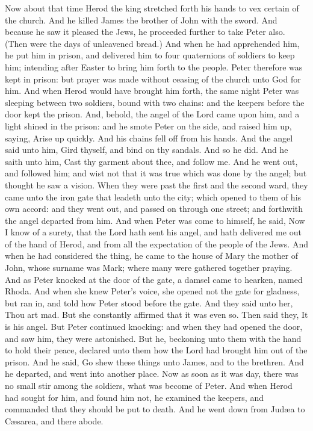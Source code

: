  Now about that time Herod the king stretched forth his
hands to vex certain of the church.  And he killed James
the brother of John with the sword.  And because he saw it
pleased the Jews, he proceeded further to take Peter also. (Then were
the days of unleavened bread.)  And when he had
apprehended him, he put him in prison, and delivered him to four
quaternions of soldiers to keep him; intending after Easter to bring him
forth to the people.  Peter therefore was kept in prison:
but prayer was made without ceasing of the church unto God for him.
 And when Herod would have brought him forth, the same
night Peter was sleeping between two soldiers, bound with two chains:
and the keepers before the door kept the prison.  And,
behold, the angel of the Lord came upon him, and a light shined in the
prison: and he smote Peter on the side, and raised him up, saying, Arise
up quickly. And his chains fell off from his hands.  And
the angel said unto him, Gird thyself, and bind on thy sandals. And so
he did. And he saith unto him, Cast thy garment about thee, and follow
me.  And he went out, and followed him; and wist not that
it was true which was done by the angel; but thought he saw a vision.
 When they were past the first and the second ward, they
came unto the iron gate that leadeth unto the city; which opened to them
of his own accord: and they went out, and passed on through one street;
and forthwith the angel departed from him.  And when
Peter was come to himself, he said, Now I know of a surety, that the
Lord hath sent his angel, and hath delivered me out of the hand of
Herod, and from all the expectation of the people of the Jews.
 And when he had considered the thing, he came to the
house of Mary the mother of John, whose surname was Mark; where many
were gathered together praying.  And as Peter knocked at
the door of the gate, a damsel came to hearken, named Rhoda.
 And when she knew Peter's voice, she opened not the gate
for gladness, but ran in, and told how Peter stood before the gate.
 And they said unto her, Thou art mad. But she constantly
affirmed that it was even so. Then said they, It is his angel.
 But Peter continued knocking: and when they had opened
the door, and saw him, they were astonished.  But he,
beckoning unto them with the hand to hold their peace, declared unto
them how the Lord had brought him out of the prison. And he said, Go
shew these things unto James, and to the brethren. And he departed, and
went into another place.  Now as soon as it was day,
there was no small stir among the soldiers, what was become of Peter.
 And when Herod had sought for him, and found him not, he
examined the keepers, and commanded that they should be put to death.
And he went down from Judæa to Cæsarea, and there abode.

